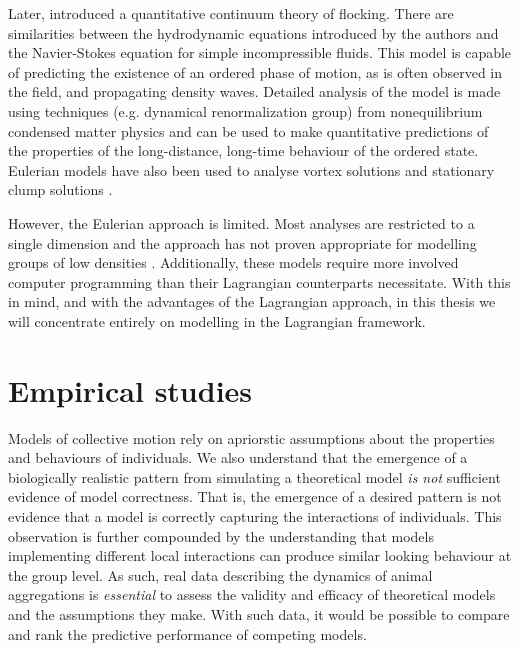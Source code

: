 Later, \textcite{toner98} introduced a quantitative continuum theory of
flocking. There are similarities between the hydrodynamic equations introduced
by the authors and the Navier-Stokes equation for simple incompressible fluids.
This model is capable of predicting the existence of an ordered phase of
motion, as is often observed in the field, and propagating density waves.
Detailed analysis of the model is made using techniques (e.g. dynamical
renormalization group) from nonequilibrium condensed matter physics and can be
used to make quantitative predictions of the properties of the long-distance,
long-time behaviour of the ordered state. Eulerian models have also been used
to analyse vortex solutions \parencite{topaz04} and stationary clump solutions
\parencite{topaz06}.

However, the Eulerian approach is limited. Most analyses are restricted to a
single dimension and the approach has not proven appropriate for modelling
groups of low densities \parencite{giardina08}. Additionally, these models
require more involved computer programming than their Lagrangian counterparts
necessitate. With this in mind, and with the advantages of the Lagrangian
approach, in this thesis we will concentrate entirely on modelling in the
Lagrangian framework.

\section{Empirical studies}
\label{sec:empirical_studies}

Models of collective motion rely on apriorstic assumptions about the properties
and behaviours of individuals. We also understand that the emergence of a
biologically realistic pattern from simulating a theoretical model \emph{is
not} sufficient evidence of model correctness. That is, the emergence of a
desired pattern is not evidence that a model is correctly capturing the
interactions of individuals. This observation is further compounded by the
understanding that models implementing different local interactions can produce
similar looking behaviour at the group level. As such, real data describing the
dynamics of animal aggregations is \emph{essential} to assess the validity and
efficacy of theoretical models and the assumptions they make. With such data,
it would be possible to compare and rank the predictive performance of
competing models.


